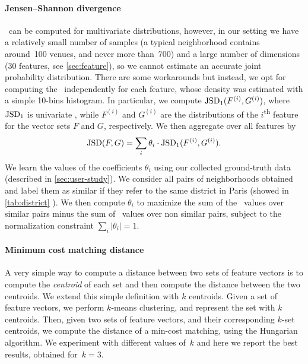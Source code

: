 \paragraph{Jensen--Shannon divergence}
\jsd\ can be computed for multivariate distributions, 
however, in our setting we have a relatively small number of samples
(a typical neighborhood contains around~100 venues, and never more
than~700) and a large number of dimensions ($30$ features, see 
\autoref{sec:feature}), 
so we cannot estimate an accurate joint probability distribution.
There are some workarounds \autocite{EstimateKL07} but instead,
we opt for computing the \jsd\ independently for each feature, whose density
was estimated with a simple 10-bins histogram. 
In particular, we compute
$\mathrm{{JSD}}_1(F^{(i)},G^{(i)})$,  
where  
$\mathrm{{JSD}}_1$ is univariate \jsd, while 
$F^{(i)}$ and $G^{(i)}$ are the distributions of the $i$\textsuperscript{th} feature for
the vector sets $F$ and $G$, respectively.
We then aggregate over all features by
\begin{equation}
\label{equation:jsd}
\mathrm{{JSD}}(F,G) = 
\sum_{i} \theta_i \cdot\mathrm{{JSD}}_1(F^{(i)},G^{(i)}).
\end{equation}
We learn the values of the coefficients $\theta_i$ using our collected
ground-truth data (described in \autoref{sec:user-study}). We consider all
pairs of neighborhoods obtained and label them as similar if they refer to the
same district in Paris (showed in \autoref{tab:district}
). We then compute $\theta_i$ to maximize the sum of the
\jsd\ values over similar pairs minus the sum of \jsd\ values over non similar
pairs, subject to the normalization constraint $\sum_i |\theta_i| =1$.

\paragraph{Minimum cost matching distance}
A very simple way to compute a distance between two sets of feature vectors is
to compute the \emph{centroid} of each set and then compute the distance
between the two centroids.  We extend this simple definition with $k$
centroids.  Given a set of feature vectors, we perform $k$-means clustering,
and represent the set with $k$ centroids.  Then, given two sets of feature
vectors, and their corresponding $k$-set centroids, we compute the distance of
a min-cost matching, using the Hungarian algorithm.  We experiment with
different values of~$k$ and here we report the best results, obtained
for~$k=3$.

